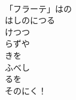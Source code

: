 \documentclass[10pt,b5j]{tarticle} %
\begin{document}
\begin{enumerate}
\begin{minipage}[c]{\blocksize}
    \end{minipage}
    \begin{minipage}[c]{\blocksize}
        
        \vspace{\linespace}
        \item~\\
        「フラーテ」はの\\
        はしのにつる\\
        けつつ\\
        らずや\\
        きを\\
        ふべし\\
        るを\\
        そのにく！
    
    \end{minipage}
\end{enumerate} %
\end{document}
